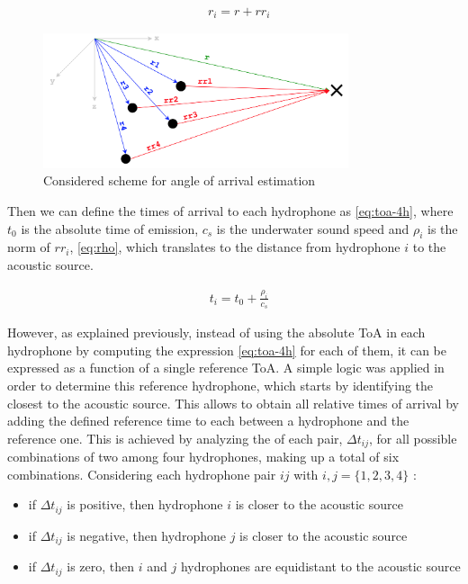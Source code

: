 \begin{eqnarray}
	& r_i = r + rr_i
	\label{eq:sum-vec}
\end{eqnarray}

\begin{figure}[!htbp]
	\centering
	\includegraphics[width=0.8\textwidth]{figures/AoA-init}
	\captionsetup{justification=centering,margin=2cm}
	\caption{Considered scheme for angle of arrival estimation}
	\label{fig:AoA-init}
\end{figure}

Then we can define the times of arrival to each hydrophone as \ref{eq:toa-4h}, where $t_0$ is the absolute time of emission, $c_s$ is the underwater sound speed and $\rho_i$ is the norm of $rr_i$, \ref{eq:rho}, which translates to the distance from hydrophone $i$ to the acoustic source. 

\begin{eqnarray}
	& t_i = t_0 +  \frac{\rho_i}{c_s}
	\label{eq:toa-4h}
\end{eqnarray}

However, as explained previously, instead of using the absolute ToA in each hydrophone by computing the expression \ref{eq:toa-4h} for each of them, it can be expressed as a function of a single reference ToA. A simple logic was applied in order to determine this reference hydrophone, which starts by identifying the closest to the acoustic source. This allows to obtain all relative times of arrival by adding the defined reference time to each  between a hydrophone and the reference one. This is achieved by analyzing the  of each pair, $ \Delta t_{ij}$, for all possible combinations of two among four hydrophones, making up a total of six combinations. Considering each hydrophone pair $ij$ with $i, j= \{1,2,3,4\}$ :

\begin{itemize}
	\item if $ \Delta t_{ij}$ is positive, then hydrophone $i$ is closer to the acoustic source
	\item if $ \Delta t_{ij}$ is negative, then hydrophone $j$ is closer to the acoustic source
	\item if $ \Delta t_{ij}$ is zero, then $i$ and $j$ hydrophones are equidistant to the acoustic source
\end{itemize}

